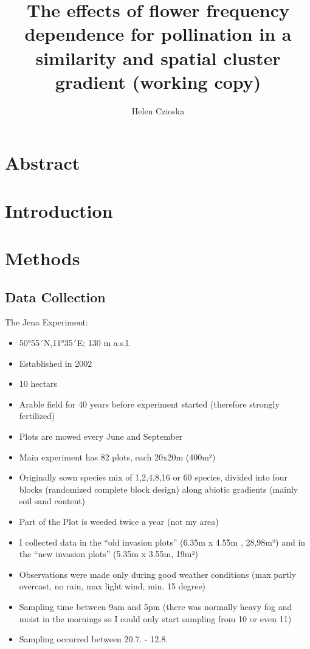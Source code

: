 \documentclass{article}
\title {The effects of flower frequency dependence for pollination in a similarity and spatial cluster gradient (working copy)}
\author {Helen Czioska}
\begin{document}
\maketitle

\section{Abstract}

\section{Introduction}

\section{Methods}

\subsection{Data Collection}

The Jena Experiment:

\begin{itemize}
\item	50°55´N,11°35´E; 130 m a.s.l.
\item	Established in 2002
\item	10 hectars
\item	Arable field for 40 years before experiment started (therefore strongly fertilized)
\item	Plots are mowed every June and September
\item	Main experiment has 82 plots, each 20x20m (400m²)
\item	Originally sown species mix of 1,2,4,8,16 or 60 species, divided into four blocks (randomized complete block design) along abiotic gradients (mainly soil sand content)
\item	Part of the Plot is weeded twice a year (not my area)
\item	I collected data in the “old invasion plots” (6.35m x 4.55m , 28,98m²) and in the “new invasion plots” (5.35m x 3.55m, 19m²)
\item	Observations were made only during good weather conditions (max partly overcast, no rain, max light wind, min. 15 degree)
\item	Sampling time between 9am and 5pm (there was normally heavy fog and moist in the mornings so I could only start sampling from 10 or even 11)
\item	Sampling occurred between 20.7. -  12.8.
\end{itemize}
\end{document}
